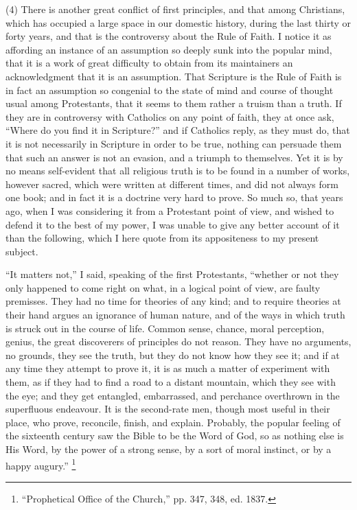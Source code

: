 (4) There is another great conflict of first principles, and that
among Christians, which has occupied a large space in our domestic
history, during the last thirty or forty years, and that is the
controversy about the Rule of Faith. I notice it as affording an
instance of an assumption so deeply sunk into the popular mind, that
it is a work of great difficulty to obtain from its maintainers an
acknowledgment that it is an assumption. That Scripture is the Rule of
Faith is in fact an assumption so congenial to the state of mind and
course of thought usual among Protestants, that it seems to them
rather a truism than a truth. If they are in controversy with
Catholics on any point of faith, they at once ask, ``Where do you
find it in Scripture?'' and if Catholics reply, as they must do,
that it is not necessarily in Scripture in order to be true, nothing
can persuade them that such an answer is not an evasion, and a triumph
to themselves. Yet it is by no means self-evident that all
religious truth is to be found in a number of works, however sacred,
which were written at different times, and did not always form one
book; and in fact it is a doctrine very hard to prove. So much so,
that years ago, when I was considering it from a Protestant point of
view, and wished to defend it to the best of my power, I was unable to
give any better account of it than the following, which I here quote
from its appositeness to my present subject.

``It matters not,'' I said, speaking of the first
Protestants, ``whether or not they only happened to come right on
what, in a logical point of view, are faulty premisses. They had no
time for theories of any kind; and to require theories at their hand
argues an ignorance of human nature, and of the ways in which truth is
struck out in the course of life. Common sense, chance, moral
perception, genius, the great discoverers of principles do not reason.
They have no arguments, no grounds, they see the truth, but they do
not know how they see it; and if at any time they attempt to prove it,
it is as much a matter of experiment with them, as if they had to find
a road to a distant mountain, which they see with the eye; and they
get entangled, embarrassed, and perchance overthrown in the
superfluous endeavour. It is the second-rate men, though most useful
in their place, who prove, reconcile, finish, and explain. Probably,
the popular feeling of the sixteenth century saw the Bible to be the
Word of God, so as nothing else is His Word, by the power of a strong
sense, by a sort of moral instinct, or by a happy augury.'' \footnote{``Prophetical Office of the
Church,'' pp. 347, 348, ed. 1837.}

